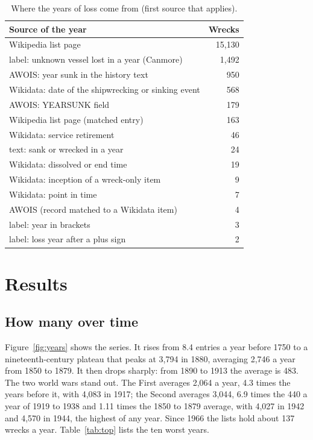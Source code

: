 \documentclass[11pt,a4paper]{article}
\begin{document}
\begin{table}[tbp]\centering\small\caption{Where the years of loss come from (first source that applies).}\label{tab:methods}\begin{tabular}{lr}\toprule Source of the year & Wrecks\\\midrule
Wikipedia list page & 15,130\\
label: unknown vessel lost in a year (Canmore) & 1,492\\
AWOIS: year sunk in the history text & 950\\
Wikidata: date of the shipwrecking or sinking event & 568\\
AWOIS: YEARSUNK field & 179\\
Wikipedia list page (matched entry) & 163\\
Wikidata: service retirement & 46\\
text: sank or wrecked in a year & 24\\
Wikidata: dissolved or end time & 19\\
Wikidata: inception of a wreck-only item & 9\\
Wikidata: point in time & 7\\
AWOIS (record matched to a Wikidata item) & 4\\
label: year in brackets & 3\\
label: loss year after a plus sign & 2\\
\bottomrule\end{tabular}\end{table}

\section{Results}
\subsection{How many over time}
Figure~\ref{fig:years} shows the series. It rises from 8.4 entries a year before 1750 to a nineteenth-century plateau that peaks at 3,794 in 1880, averaging 2,746 a year from 1850 to 1879. It then drops sharply: from 1890 to 1913 the average is 483. The two world wars stand out. The First averages 2,064 a year, 4.3 times the years before it, with 4,083 in 1917; the Second averages 3,044, 6.9 times the 440 a year of 1919 to 1938 and 1.11 times the 1850 to 1879 average, with 4,027 in 1942 and 4,570 in 1944, the highest of any year. Since 1966 the lists hold about 137 wrecks a year. Table~\ref{tab:top} lists the ten worst years.
\end{document}
